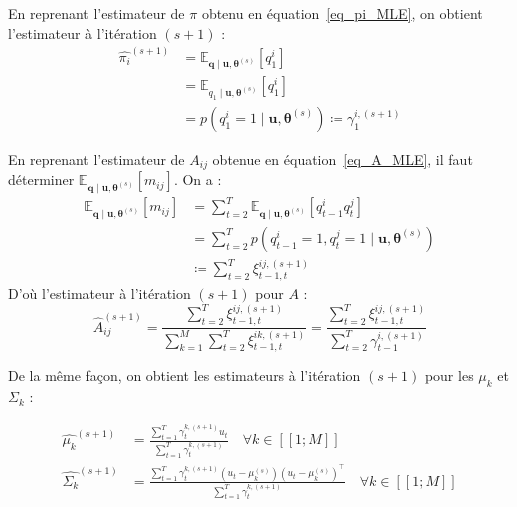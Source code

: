 \documentclass[12pt,a4paper,onecolumn]{article}
\begin{document}
En reprenant l'estimateur de \(\pi\) obtenu en équation~\eqref{eq_pi_MLE}, on obtient l'estimateur à l'itération \((s + 1)\) :
\begin{equation}
	\begin{split}
		\widehat{\pi_{i}}^{(s + 1)} &= \mathbb{E}_{\bm{q} \mid \bm{u}, \bm{\theta}^{(s)}}[q_1^i] \\
		&= \mathbb{E}_{q_1 \mid \bm{u}, \bm{\theta}^{(s)}}[q_1^i] \\
		&= p(q_1^i = 1 \mid \bm{u}, \bm{\theta}^{(s)}) \coloneqq \gamma_1^{i, (s+1)}
	\end{split}
\end{equation}

En reprenant l'estimateur de \(A_{ij}\) obtenue en équation~\eqref{eq_A_MLE}, il faut déterminer \(\mathbb{E}_{\bm{q} \mid \bm{u}, \bm{\theta}^{(s)}}[m_{ij}]\). On a :
\begin{equation*}
	\begin{split}
		\mathbb{E}_{\bm{q} \mid \bm{u}, \bm{\theta}^{(s)}}[m_{ij}] &= \sum_{t=2}^T \mathbb{E}_{\bm{q} \mid \bm{u}, \bm{\theta}^{(s)}}\left[q_{t-1}^i q_t^j\right]\\
		&= \sum_{t=2}^T p\left(q_{t-1}^i = 1, q_t^j = 1 \mid \bm{u}, \bm{\theta}^{(s)}\right)\\
		&\coloneqq \sum_{t=2}^T \xi^{ij, (s+1)}_{t-1, t}
	\end{split}
\end{equation*}
D'où l'estimateur à l'itération \((s+1)\) pour \(A\) :
\begin{equation}
	\widehat{A}_{ij}^{(s+1)} = \frac{\sum_{t=2}^T \xi^{ij, (s+1)}_{t-1, t}}{\sum_{k = 1}^M\sum_{t=2}^T \xi^{ik, (s+1)}_{t-1, t}} = \frac{\sum_{t=2}^T \xi^{ij, (s+1)}_{t-1, t}}{\sum_{t=2}^T \gamma^{i, (s+1)}_{t-1}}
\end{equation}

De la même façon, on obtient les estimateurs à l'itération \((s+1)\) pour les \(\mu_k\) et \(\Sigma_k\) :

\begin{equation}
	\begin{aligned}
		\widehat{\mu_k}^{(s+1)}    & = \frac{\sum_{t = 1}^T \gamma_{t}^{k,(s+1)} u_t}{\sum_{t = 1}^T \gamma_{t}^{k,(s+1)}} \quad \forall k \in [\![1;M]\!]                                                                     \\
		\widehat{\Sigma_k}^{(s+1)} & = \frac{\sum_{t = 1}^T \gamma_{t}^{k,(s+1)}\left(u_t - \mu_k^{(s)}\right)\left(u_t - \mu_k^{(s)}\right)^{\intercal}}{\sum_{t = 1}^T \gamma_{t}^{k,(s+1)}} \quad \forall k \in [\![1;M]\!] \\
	\end{aligned}
\end{equation}
\end{document}
